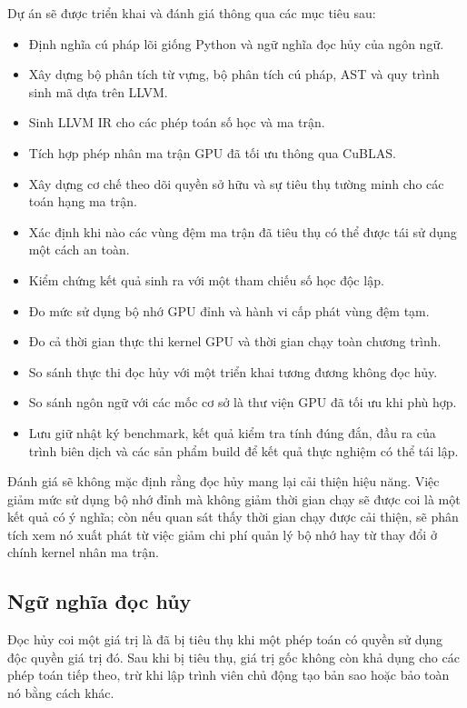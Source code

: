 \documentclass[a4paper]{article}
\begin{document}
	Dự án sẽ được triển khai và đánh giá thông qua các mục tiêu sau:
	
	\begin{itemize}
		\item Định nghĩa cú pháp lõi giống Python và ngữ nghĩa đọc hủy của ngôn ngữ.
		\item Xây dựng bộ phân tích từ vựng, bộ phân tích cú pháp, AST và quy trình sinh mã dựa trên LLVM.
		\item Sinh LLVM IR cho các phép toán số học và ma trận.
		\item Tích hợp phép nhân ma trận GPU đã tối ưu thông qua CuBLAS.
		\item Xây dựng cơ chế theo dõi quyền sở hữu và sự tiêu thụ tường minh cho các toán hạng ma trận.
		\item Xác định khi nào các vùng đệm ma trận đã tiêu thụ có thể được tái sử dụng một cách an toàn.
		\item Kiểm chứng kết quả sinh ra với một tham chiếu số học độc lập.
		\item Đo mức sử dụng bộ nhớ GPU đỉnh và hành vi cấp phát vùng đệm tạm.
		\item Đo cả thời gian thực thi kernel GPU và thời gian chạy toàn chương trình.
		\item So sánh thực thi đọc hủy với một triển khai tương đương không đọc hủy.
		\item So sánh ngôn ngữ với các mốc cơ sở là thư viện GPU đã tối ưu khi phù hợp.
		\item Lưu giữ nhật ký benchmark, kết quả kiểm tra tính đúng đắn, đầu ra của trình biên dịch và các sản phẩm build để kết quả thực nghiệm có thể tái lập.
	\end{itemize}
	
	Đánh giá sẽ không mặc định rằng đọc hủy mang lại cải thiện hiệu năng. Việc giảm mức sử dụng bộ nhớ đỉnh mà không giảm thời gian chạy sẽ được coi là một kết quả có ý nghĩa; còn nếu quan sát thấy thời gian chạy được cải thiện, sẽ phân tích xem nó xuất phát từ việc giảm chi phí quản lý bộ nhớ hay từ thay đổi ở chính kernel nhân ma trận.
	
	\subsection{Ngữ nghĩa đọc hủy}
	
	Đọc hủy coi một giá trị là đã bị tiêu thụ khi một phép toán có quyền sử dụng độc quyền giá trị đó. Sau khi bị tiêu thụ, giá trị gốc không còn khả dụng cho các phép toán tiếp theo, trừ khi lập trình viên chủ động tạo bản sao hoặc bảo toàn nó bằng cách khác.
	
\end{document}
